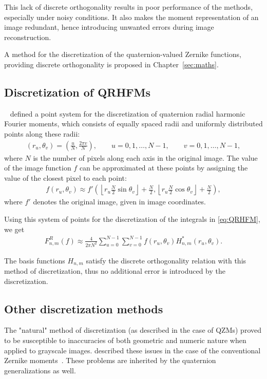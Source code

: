 This lack of discrete orthogonality results in poor performance of the methods, especially under noisy conditions. It also makes the moment representation of an image redundant, hence introducing unwanted errors during image reconstruction.


A method for the discretization of the quaternion-valued Zernike functions, providing discrete orthogonality is proposed in Chapter~\ref{sec:maths}.

\subsection{Discretization of QRHFMs}
\citeauthor{LiuAcc}~\cite{LiuAcc} defined a point system for the discretization of quaternion radial harmonic Fourier moments, which consists of equally spaced radii and uniformly distributed points along these radii:
\begin{gather*}
    (r_u, \theta_v) = \left(\frac{u}{N}, \frac{2\pi v}{N}\right), \qquad u = 0,1,\ldots ,N - 1, \qquad v = 0,1,\ldots ,N - 1,
\end{gather*}
where $N$ is the number of pixels along each axis in the original image. The value of the image function $f$ can be approximated at these points by assigning the value of the closest pixel to each point:
\begin{gather*}
    f(r_u, \theta_v) \approx f'\left(\left \lfloor r_u\frac{N}{2}\sin \theta_v \right \rfloor + \frac{N}{2}, \left \lfloor r_u\frac{N}{2}\cos \theta_v \right \rfloor + \frac{N}{2}\right),
\end{gather*}
where $f'$ denotes the original image, given in image coordinates.


Using this system of points for the discretization of the integrals in \eqref{eq:QRHFM}, we get
\begin{gather*}
    F_{n,m}^R(f) \approx \frac{4}{2\pi N^2}\sum_{u = 0}^{N-1}\sum_{v = 0}^{N-1}f(r_u, \theta_v)H_{n,m}^*(r_u, \theta_v).
\end{gather*}


The basis functions $H_{n,m}$ satisfy the discrete orthogonality relation with this method of discretization, thus no additional error is introduced by the discretization.

\subsection{Other discretization methods}
The "natural" method of discretization (as described in the case of QZMs) proved to be susceptible to inaccuracies of both geometric and numeric nature when applied to grayscale images. \citeauthor{LiaoPawlak} described these issues in the case of the conventional Zernike moments~\cite{LiaoPawlak,PawlakLiao}. These problems are inherited by the quaternion generalizations as well. 


